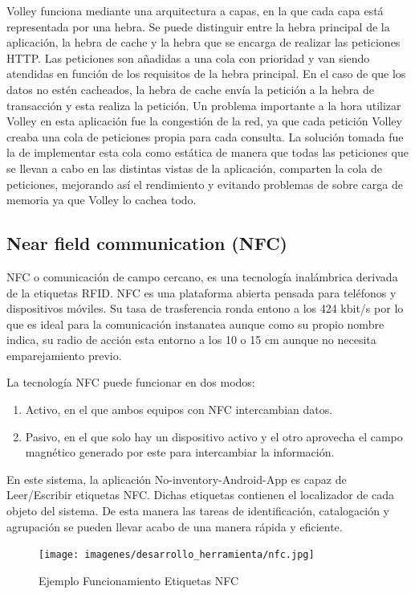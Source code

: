 \documentclass[a4paper,11pt]{book}
\begin{document}
Volley funciona mediante una arquitectura a capas, en la que cada capa está representada por una hebra. Se puede distinguir entre la hebra principal de la aplicación, la hebra de cache y la hebra que se encarga de realizar las peticiones HTTP.  Las peticiones son añadidas a una cola con prioridad y van siendo atendidas en función de los requisitos de la hebra principal. En el caso de que los datos no estén cacheados, la hebra de cache envía la petición a la hebra de transacción y esta realiza la petición. Un problema importante a la hora utilizar Volley en esta aplicación fue la congestión de la red, ya que cada petición Volley creaba una cola de peticiones propia para cada consulta. La solución tomada fue la de implementar esta cola como estática de manera que todas las peticiones que se llevan a cabo en las distintas vistas de la aplicación, comparten la cola de peticiones, mejorando así el rendimiento y evitando problemas de sobre carga de memoria ya que Volley lo cachea todo. 


\subsection{Near field communication (NFC)}
NFC\cite{nfc} o comunicación de campo cercano, es una tecnología inalámbrica derivada de la etiquetas RFID. NFC es una plataforma abierta pensada para teléfonos  y dispositivos móviles. Su tasa de trasferencia ronda entono a los  424 kbit/s por lo que es ideal para la comunicación instanatea aunque como su propio nombre indica, su radio de acción esta entorno a los 10 o 15 cm aunque no necesita emparejamiento previo. 

La tecnología NFC puede funcionar en dos modos:

\begin{enumerate}
\item Activo, en el que ambos equipos con NFC intercambian datos. 
\item Pasivo, en el que solo hay un dispositivo activo y el otro aprovecha el campo magnético generado por este para intercambiar la información.
\end{enumerate}

En este sistema, la aplicación No-inventory-Android-App es capaz de Leer/Escribir etiquetas NFC. Dichas etiquetas contienen el localizador de cada objeto del sistema. De esta manera las tareas de identificación, catalogación y agrupación  se pueden llevar acabo de una manera rápida y eficiente.

\begin{figure}[H] 
\centering 
\texttt{[image: imagenes/desarrollo\_herramienta/nfc.jpg]}
\caption{ Ejemplo Funcionamiento Etiquetas NFC\cite{nfc4}}
\end{figure}
\end{document}
